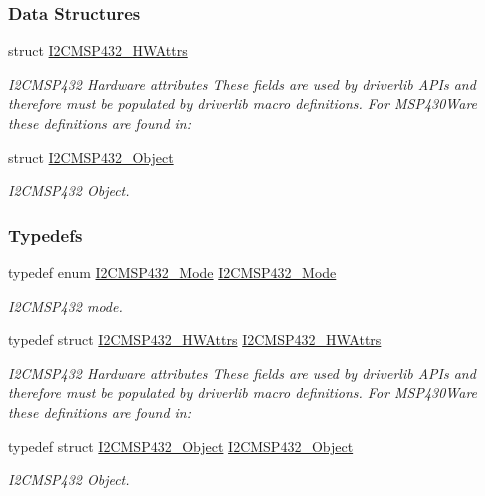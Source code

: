 \subsubsection*{Data Structures}
\begin{DoxyCompactItemize}
\item 
struct \hyperlink{struct_i2_c_m_s_p432___h_w_attrs}{I2\+C\+M\+S\+P432\+\_\+\+H\+W\+Attrs}
\begin{DoxyCompactList}\small\item\em I2\+C\+M\+S\+P432 Hardware attributes These fields are used by driverlib A\+P\+Is and therefore must be populated by driverlib macro definitions. For M\+S\+P430\+Ware these definitions are found in\+: \end{DoxyCompactList}\item 
struct \hyperlink{struct_i2_c_m_s_p432___object}{I2\+C\+M\+S\+P432\+\_\+\+Object}
\begin{DoxyCompactList}\small\item\em I2\+C\+M\+S\+P432 Object. \end{DoxyCompactList}\end{DoxyCompactItemize}
\subsubsection*{Typedefs}
\begin{DoxyCompactItemize}
\item 
typedef enum \hyperlink{_i2_c_m_s_p432_8h_aec46b533f0842a3ce99decddeaaadd74}{I2\+C\+M\+S\+P432\+\_\+\+Mode} \hyperlink{_i2_c_m_s_p432_8h_a488555a795063972a9c74832de86c5f7}{I2\+C\+M\+S\+P432\+\_\+\+Mode}
\begin{DoxyCompactList}\small\item\em I2\+C\+M\+S\+P432 mode. \end{DoxyCompactList}\item 
typedef struct \hyperlink{struct_i2_c_m_s_p432___h_w_attrs}{I2\+C\+M\+S\+P432\+\_\+\+H\+W\+Attrs} \hyperlink{_i2_c_m_s_p432_8h_a7bf10d73c67977cd12a2d465d2412ed6}{I2\+C\+M\+S\+P432\+\_\+\+H\+W\+Attrs}
\begin{DoxyCompactList}\small\item\em I2\+C\+M\+S\+P432 Hardware attributes These fields are used by driverlib A\+P\+Is and therefore must be populated by driverlib macro definitions. For M\+S\+P430\+Ware these definitions are found in\+: \end{DoxyCompactList}\item 
typedef struct \hyperlink{struct_i2_c_m_s_p432___object}{I2\+C\+M\+S\+P432\+\_\+\+Object} \hyperlink{_i2_c_m_s_p432_8h_aa3af568a4521fd6f2444f4dc62ed7c59}{I2\+C\+M\+S\+P432\+\_\+\+Object}
\begin{DoxyCompactList}\small\item\em I2\+C\+M\+S\+P432 Object. \end{DoxyCompactList}\end{DoxyCompactItemize}
